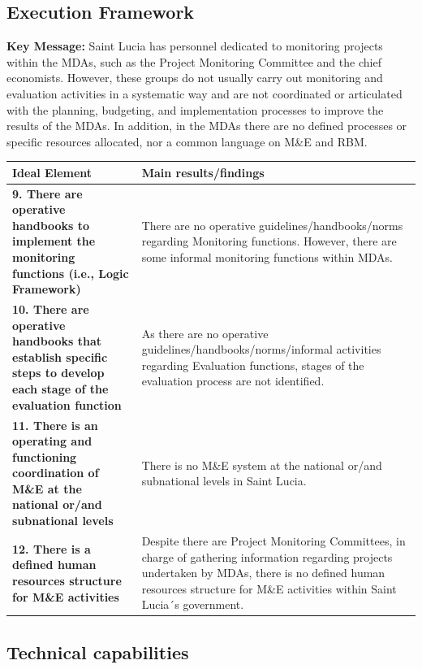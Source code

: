 \documentclass[
  10pt,
]{book}
\begin{document}
\hypertarget{execution-framework}{%
\subsection{Execution Framework}\label{execution-framework}}

\textbf{Key Message:}
Saint Lucia has personnel dedicated to monitoring projects within the MDAs, such as the Project Monitoring Committee and the chief economists. However, these groups do not usually carry out monitoring and evaluation activities in a systematic way and are not coordinated or articulated with the planning, budgeting, and implementation processes to improve the results of the MDAs. In addition, in the MDAs there are no defined processes or specific resources allocated, nor a common language on M\&E and RBM.

\begingroup\fontsize{12}{14}\selectfont

\begin{tabu} to 
\hline
Ideal Element & Main results/findings\\
\hline
\textbf{9. There are operative handbooks to implement the monitoring functions (i.e., Logic Framework)} & There are no operative guidelines/handbooks/norms regarding Monitoring functions. However, there are some informal monitoring functions within MDAs.\\
\hline
\textbf{10. There are operative handbooks that establish specific steps to develop each stage of the evaluation function} & As there are no operative guidelines/handbooks/norms/informal activities regarding Evaluation functions, stages of the evaluation process are not identified.\\
\hline
\textbf{11. There is an operating and functioning coordination of M\&E at the national or/and subnational levels} & There is no M\&E system at the national or/and subnational levels in Saint Lucia.\\
\hline
\textbf{12. There is a defined human resources structure for M\&E activities} & Despite there are Project Monitoring Committees, in charge of gathering information regarding projects undertaken by MDAs, there is no defined human resources structure for M\&E activities within Saint Lucia´s government.\\
\hline
\end{tabu}
\endgroup{}

\hypertarget{technical-capabilities}{%
\subsection{Technical capabilities}\label{technical-capabilities}}
\end{document}
